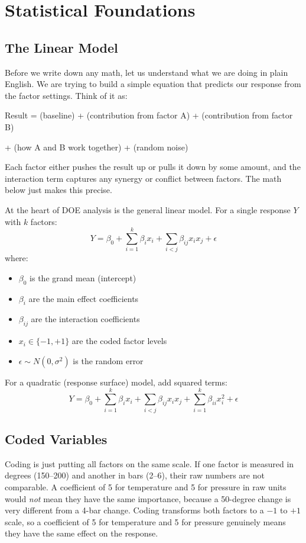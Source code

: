 \documentclass[11pt]{book}
\begin{document}
\chapter{Statistical Foundations}

\section{The Linear Model}

Before we write down any math, let us understand what we are doing in plain
English. We are trying to build a simple equation that predicts our response
from the factor settings. Think of it as:

\medskip
\centerline{Result = (baseline) + (contribution from factor A) + (contribution from factor B)}
\centerline{+ (how A and B work together) + (random noise)}
\medskip

\noindent
Each factor either pushes the result up or pulls it down by some amount, and
the interaction term captures any synergy or conflict between factors. The math
below just makes this precise.

At the heart of DOE analysis is the general linear model. For a single response
$Y$ with $k$ factors:
\[
Y = \beta_0 + \sum_{i=1}^{k} \beta_i x_i
+ \sum_{i<j} \beta_{ij} x_i x_j + \epsilon
\]
where:
\begin{itemize}[nosep]
\item $\beta_0$ is the grand mean (intercept)
\item $\beta_i$ are the main effect coefficients
\item $\beta_{ij}$ are the interaction coefficients
\item $x_i \in \{-1, +1\}$ are the coded factor levels
\item $\epsilon \sim N(0, \sigma^2)$ is the random error
\end{itemize}

For a quadratic (response surface) model, add squared terms:
\[
Y = \beta_0 + \sum_{i=1}^{k} \beta_i x_i
+ \sum_{i<j} \beta_{ij} x_i x_j
+ \sum_{i=1}^{k} \beta_{ii} x_i^2 + \epsilon
\]

\section{Coded Variables}

Coding is just putting all factors on the same scale. If one factor is measured
in degrees (150--200) and another in bars (2--6), their raw numbers are not
comparable. A coefficient of 5 for temperature and 5 for pressure in raw units
would \emph{not} mean they have the same importance, because a 50-degree change
is very different from a 4-bar change. Coding transforms both factors to a $-1$
to $+1$ scale, so a coefficient of 5 for temperature and 5 for pressure
genuinely means they have the same effect on the response.
\end{document}
